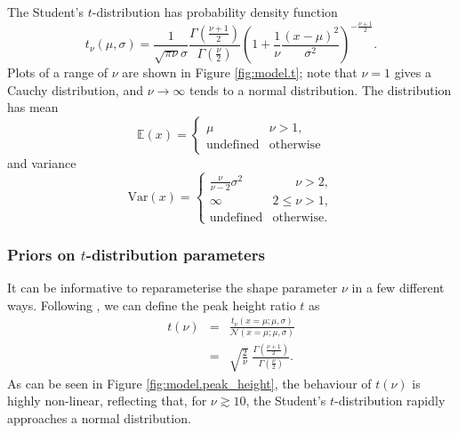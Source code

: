 \documentclass[fleqn,usenatbib]{mnras}
\newcommand{\studentt}[2]{t_\nu \left( #1, #2 \right)}
\begin{document}
The Student's $t$-distribution has probability density function
\begin{equation}
    \studentt{\mu}{\sigma}
        =
    \frac{1}{\sqrt{\pi \nu} \sigma}
    \frac{
        \Gamma \left(\frac{\nu + 1}2\right)
    }{
        \Gamma \left(\frac{\nu}2\right)
    }
    \left(
        1 + \frac{1}{\nu} \frac{\left(x - \mu\right)^2}{\sigma^2}
    \right)^{
        -\frac{\nu + 1}{2}
    }.
\end{equation}
Plots of a range of $\nu$ are shown in Figure \ref{fig:model.t}; note that $\nu
= 1$ gives a Cauchy distribution, and $\nu \rightarrow \infty$ tends to a normal
distribution. The distribution has mean
\begin{equation}
    \mathbb{E}(x)
        =
    \begin{cases}
        \mu & \nu > 1, \\
        \textrm{undefined} & \textrm{otherwise}
    \end{cases}
\end{equation}
and variance
\begin{equation}
    \mathrm{Var}(x)
        =
    \begin{cases}
        \frac{\nu}{\nu - 2} \sigma^2 & \phantom{2 \leq} \nu > 2, \\
        \infty & 2 \leq \nu > 1, \\
        \textrm{undefined} & \textrm{otherwise.}
    \end{cases}
\end{equation}

\subsubsection{Priors on $t$-distribution parameters}
\label{sec:formalism.sampling.prior}

It can be informative to reparameterise the shape parameter $\nu$ in a few
different ways. Following \citet{Feeney:2018}, we can define the peak height
ratio $t$ as
\begin{eqnarray}
    t(\nu) &=& \frac{
        \studentt{x = \mu; \mu}{\sigma}
    }{
        \mathcal N \left(x = \mu; \mu, \sigma \right)
    } \\
    &=& \sqrt{\frac{2}{\nu}} \;
    \frac{
        \Gamma\left(\frac{\nu + 1}{2}\right)
    }{
        \Gamma\left(\frac{\nu}{2}\right)
    }.
\end{eqnarray}
As can be seen in Figure \ref{fig:model.peak_height}, the behaviour of $t(\nu)$
is highly non-linear, reflecting that, for $\nu \gtrsim 10$, the Student's
$t$-distribution rapidly approaches a normal distribution.
\end{document}
